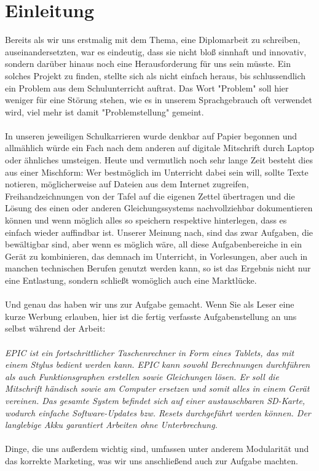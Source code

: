 \section{Einleitung}
Bereits als wir uns erstmalig mit dem Thema, eine Diplomarbeit zu schreiben, auseinandersetzten, war es eindeutig, dass sie nicht bloß sinnhaft und innovativ, sondern darüber hinaus noch eine Herausforderung für uns sein müsste. Ein solches Projekt zu finden, stellte sich als nicht einfach heraus, bis schlussendlich ein Problem aus dem Schulunterricht auftrat. Das Wort "Problem" soll hier weniger für eine Störung stehen, wie es in unserem Sprachgebrauch oft verwendet wird, viel mehr ist damit "Problemstellung" gemeint.\\\\
In unseren jeweiligen Schulkarrieren wurde denkbar auf Papier begonnen und allmählich würde ein Fach nach dem anderen auf  digitale Mitschrift durch Laptop oder ähnliches umsteigen. Heute und vermutlich noch sehr lange Zeit besteht dies aus einer Mischform: Wer bestmöglich im Unterricht dabei sein will, sollte Texte notieren, möglicherweise auf Dateien aus dem Internet zugreifen, Freihandzeichnungen von der Tafel auf die eigenen Zettel übertragen und die Lösung des einen oder anderen Gleichungssystems nachvollziehbar dokumentieren können und wenn möglich alles so speichern respektive hinterlegen, dass es einfach wieder auffindbar ist. Unserer Meinung nach, sind das zwar Aufgaben, die bewältigbar sind, aber wenn es möglich wäre, all diese Aufgabenbereiche in ein Gerät zu kombinieren, das demnach im Unterricht, in Vorlesungen, aber auch in manchen technischen Berufen genutzt werden kann, so ist das Ergebnis nicht nur eine Entlastung, sondern schließt womöglich auch eine Marktlücke.\\\\
Und genau das haben wir uns zur Aufgabe gemacht. Wenn Sie als Leser eine kurze Werbung erlauben, hier ist die fertig verfasste Aufgabenstellung an uns selbst während der Arbeit:\\\\
\textit{EPIC ist ein fortschrittlicher Taschenrechner in Form eines Tablets, das mit einem Stylus bedient werden kann. EPIC kann sowohl Berechnungen durchführen als auch Funktionsgraphen erstellen sowie Gleichungen lösen. Er soll die Mitschrift händisch sowie am Computer ersetzen und somit alles in einem Gerät vereinen. Das gesamte System befindet sich auf einer austauschbaren SD-Karte, wodurch einfache Software-Updates bzw. Resets durchgeführt werden können. Der langlebige Akku garantiert Arbeiten ohne Unterbrechung.}\\\\
Dinge, die uns außerdem wichtig sind, umfassen unter anderem Modularität und das korrekte Marketing, was wir uns anschließend auch zur Aufgabe machten.

